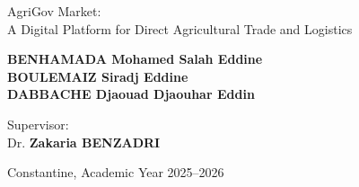 \begin{titlepage}
		\begin{center}
			\fontsize{20pt}{20pt}\selectfont
			AgriGov Market:\\
			A Digital Platform for Direct Agricultural Trade and Logistics
		\end{center}
		 
		\begin{center}
			\vspace{1cm}
			\fontsize{16pt}{18pt}\selectfont
			\textbf{BENHAMADA Mohamed Salah Eddine}\\
			\textbf{BOULEMAIZ Siradj Eddine}\\
			\textbf{DABBACHE Djaouad Djaouhar Eddin}
		\end{center}
		
		\vfill
		
		\begin{center}
			\large
			Supervisor:\\[0.3cm]
			Dr. \textbf{Zakaria BENZADRI}
		\end{center}
		
		\vspace{1cm}
		
		\begin{center}
			\small
			Constantine, Academic Year 2025--2026
		\end{center}
		
		\restoregeometry
	\end{titlepage}

